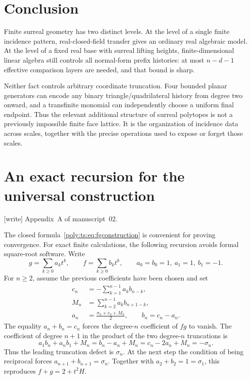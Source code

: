 \documentclass[11pt,a4paper]{article}
\numberwithin{equation}{section}
\theoremstyle{plain}
\newcommand{\wtag}{\textup{[write]}}%
\begin{document}
\section{Conclusion}
Finite surreal geometry has two distinct levels. At the level of a single
finite incidence pattern, real-closed-field transfer gives an ordinary
real algebraic model. At the level of a fixed real base with surreal
lifting heights, finite-dimensional linear algebra still controls all
normal-form prefix histories: at most $n-d-1$ effective comparison layers
are needed, and that bound is sharp.

Neither fact controls arbitrary coordinate truncation. Four bounded
planar generators can encode any binary triangle/quadrilateral history
from degree two onward, and a transfinite monomial can independently
choose a uniform final endpoint. Thus the relevant additional structure
of surreal polytopes is not a previously impossible finite face lattice.
It is the organization of incidence data across scales, together with
the precise operations used to expose or forget those scales.

\section{An exact recursion for the universal construction}\label{poly:ts:app:recurrence}
\noindent\wtag{} Appendix~A of manuscript~02.

The closed formula~\eqref{poly:ts:eq:fgconstruction} is convenient for proving
convergence. For exact finite calculations, the following recursion avoids
formal square-root software. Write
\[
 g=\sum_{k\ge0}a_k t^k,\qquad f=\sum_{k\ge0}b_k t^k,
 \qquad a_0=b_0=1,\ a_1=1,\ b_1=-1.
\]
For $n\ge2$, assume the previous coefficients have been chosen and set
\begin{equation}\label{poly:ts:eq:recursion}
 \begin{split}
 c_n&=-\sum_{k=1}^{n-1}a_k b_{n-k},\\
 M_n&=\sum_{k=2}^{n-1}a_k b_{n+1-k},\\
 a_n&=\frac{\sigma_n+c_n+M_n}{2},\qquad b_n=c_n-a_n.
 \end{split}
\end{equation}
The equality $a_n+b_n=c_n$ forces the degree-$n$ coefficient of $fg$
to vanish. The coefficient of degree $n+1$ in the product of the two
degree-$n$ truncations is
\[
 a_1b_n+a_nb_1+M_n=b_n-a_n+M_n=c_n-2a_n+M_n=-\sigma_n.
\]
Thus the leading truncation defect is $\sigma_n$. At the next step the
condition of being reciprocal forces $a_{n+1}+b_{n+1}=\sigma_n$.
Together with $a_2+b_2=1=\sigma_1$, this reproduces
$f+g=2+t^2H$.
\end{document}
